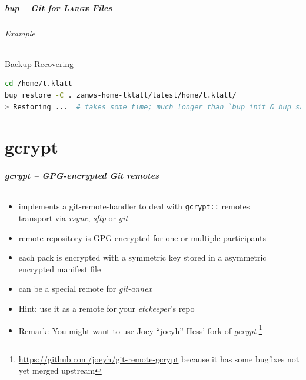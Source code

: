\documentclass[english,hyperref={pdfpagelabels=false},aspectratio=1610]{beamer}
\begin{document}
\begin{frame}[fragile]
  \frametitle{bup -- Git for \textsc{Large} Files}
  \framesubtitle{Example}
  \begin{block}{Backup Recovering}
    \vspace{-0.75em}
    \begin{lstlisting}[language=zsh]
cd /home/t.klatt
bup restore -C . zamws-home-tklatt/latest/home/t.klatt/
> Restoring ...  # takes some time; much longer than `bup init & bup save`
    \end{lstlisting}
    \vspace{-0.75em}
  \end{block}
\end{frame}



\part{gcrypt}
\makepart

\begin{frame}[label=gcrypt]
  \frametitle{gcrypt -- GPG-encrypted Git remotes}
  \framesubtitle{}
  \begin{itemize}
    \item implements a git-remote-handler to deal with \texttt{gcrypt::} remotes\\
      {\scriptsize transport via \emph{rsync}, \emph{sftp} or \emph{git}}
    \item remote repository is GPG-encrypted for one or multiple participants
    \item each pack is encrypted with a symmetric key stored in a asymmetric encrypted manifest file
    \item can be a special remote for \textit{git-annex}
    \item Hint: use it as a remote for your \textit{etckeeper}'s repo
    \item \scriptsize\color{fzjgray50}Remark: You might want to use Joey ``joeyh'' Hess' fork of \emph{gcrypt}
      \footnote{\tiny\url{https://github.com/joeyh/git-remote-gcrypt} because it has some bugfixes not yet merged upstream}
  \end{itemize}
\end{frame}
\end{document}
